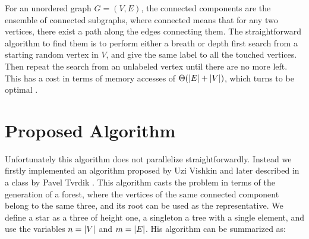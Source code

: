 %

For an unordered graph $G=(V,E)$, the connected components are the ensemble
of connected subgraphs, where connected means that for any two  vertices, there exist a path along the
 edges connecting them.
The straightforward algorithm to find them is to perform either a breath or depth first search from a starting
random vertex in $V$, and give the same label to all the touched vertices. Then repeat the search from an unlabeled vertex
until there are no more left.
This has a cost in terms of memory accesses of $\Theta(\left| E \right| + \left| V \right|)$, which turns to be optimal \cite{Hopcroft}.

\section{Proposed Algorithm}\label{sec:yourmethod}
%
%

Unfortunately this algorithm does not parallelize straightforwardly. Instead we firstly implemented
an algorithm proposed by Uzi Vishkin \cite{PCompPaper} and later described in a class by
Pavel Tvrdik \cite{PCompClass}. This algorithm casts the problem in terms of the generation of a
forest, where the vertices of the same connected component belong to the same three, and its root
can be used as the representative. We define a star as a three of height one, a singleton a tree
with a single element, and use the variables $n=\left| V \right|$ and $m=\left| E \right|$.
His algorithm can be summarized as:

